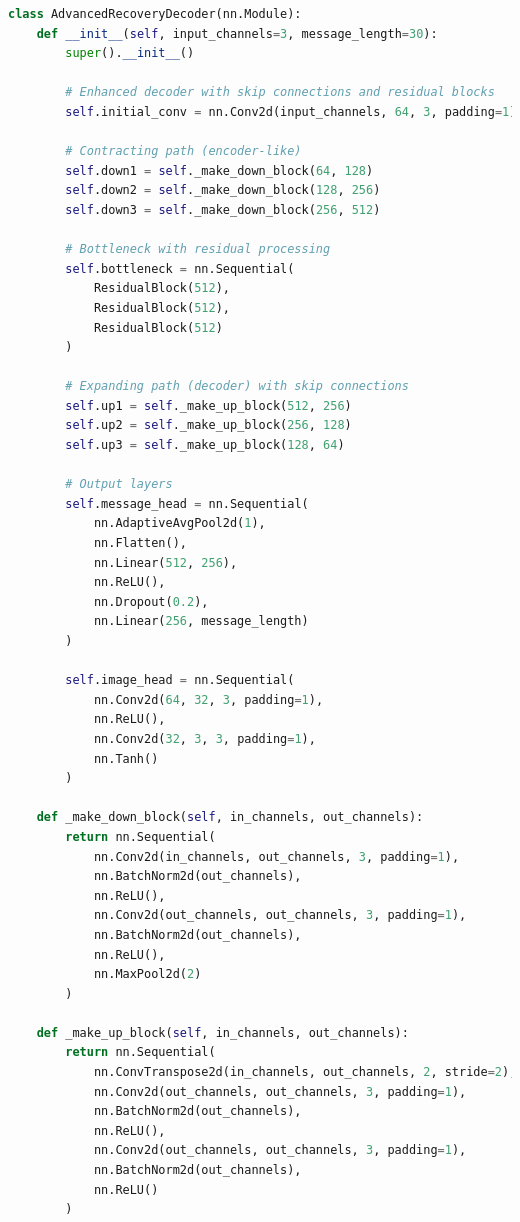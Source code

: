 \documentclass[12pt,a4paper]{report}
\begin{document}
\begin{lstlisting}[language=Python, caption=Advanced Recovery Decoder Implementation]
class AdvancedRecoveryDecoder(nn.Module):
    def __init__(self, input_channels=3, message_length=30):
        super().__init__()
        
        # Enhanced decoder with skip connections and residual blocks
        self.initial_conv = nn.Conv2d(input_channels, 64, 3, padding=1)
        
        # Contracting path (encoder-like)
        self.down1 = self._make_down_block(64, 128)
        self.down2 = self._make_down_block(128, 256)
        self.down3 = self._make_down_block(256, 512)
        
        # Bottleneck with residual processing
        self.bottleneck = nn.Sequential(
            ResidualBlock(512),
            ResidualBlock(512),
            ResidualBlock(512)
        )
        
        # Expanding path (decoder) with skip connections
        self.up1 = self._make_up_block(512, 256)
        self.up2 = self._make_up_block(256, 128)
        self.up3 = self._make_up_block(128, 64)
        
        # Output layers
        self.message_head = nn.Sequential(
            nn.AdaptiveAvgPool2d(1),
            nn.Flatten(),
            nn.Linear(512, 256),
            nn.ReLU(),
            nn.Dropout(0.2),
            nn.Linear(256, message_length)
        )
        
        self.image_head = nn.Sequential(
            nn.Conv2d(64, 32, 3, padding=1),
            nn.ReLU(),
            nn.Conv2d(32, 3, 3, padding=1),
            nn.Tanh()
        )
    
    def _make_down_block(self, in_channels, out_channels):
        return nn.Sequential(
            nn.Conv2d(in_channels, out_channels, 3, padding=1),
            nn.BatchNorm2d(out_channels),
            nn.ReLU(),
            nn.Conv2d(out_channels, out_channels, 3, padding=1),
            nn.BatchNorm2d(out_channels),
            nn.ReLU(),
            nn.MaxPool2d(2)
        )
    
    def _make_up_block(self, in_channels, out_channels):
        return nn.Sequential(
            nn.ConvTranspose2d(in_channels, out_channels, 2, stride=2),
            nn.Conv2d(out_channels, out_channels, 3, padding=1),
            nn.BatchNorm2d(out_channels),
            nn.ReLU(),
            nn.Conv2d(out_channels, out_channels, 3, padding=1),
            nn.BatchNorm2d(out_channels),
            nn.ReLU()
        )
    

\end{lstlisting}
\end{document}
